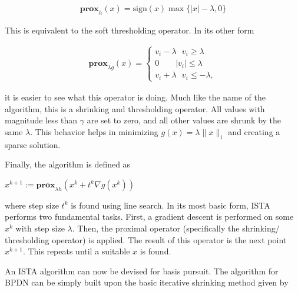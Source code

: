 \documentclass[10pt]{article} %
\begin{document}

\begin{align*}
    \mathbf{prox}_{h}(x)=\mathrm{sign}(x)\max\{|x|-\lambda, 0\}
\end{align*}

\noindent This is equivalent to the soft thresholding operator. In its other form

\vspace{\baselineskip}
\begin{align*}
    \mathbf{prox}_{\lambda g}(x) = 
    \begin{cases}
    v_i - \lambda \ \ \ v_i \geq \lambda\\
    0 \ \ \ \ \ \ \ \ \ |v_i| \leq \lambda \\
    v_i + \lambda \ \ \  v_i \leq - \lambda,
    \end{cases}
\end{align*}


\vspace{\baselineskip}

\noindent it is easier to see what this operator is doing. Much like the name of the algorithm, this is a shrinking and thresholding operator. All values with magnitude less than $\gamma$ are set to zero, and all other values are shrunk by the same $\lambda$. This behavior helps in minimizing $g(x) = \lambda \|x\|_1$ and creating a sparse solution.

\vspace{\baselineskip}

\noindent Finally, the algorithm is defined as 

\begin{center}
    $x^{k+1} := \mathbf{prox}_{\lambda h} (x^k + t^k \nabla g(x^k))$
\end{center}

\noindent where step size $t^k$ is found using line search. In its most basic form, ISTA performs two fundamental tasks. First, a gradient descent is performed on some $x^k$ with step size $\lambda$. Then, the proximal operator (specifically the shrinking/ thresholding operator) is applied. The result of this operator is the next point $x^{k+1}$. This repeats until a suitable $x$ is found. 

An ISTA algorithm can now be devised for basis pursuit. The algorithm for BPDN can be simply built upon the basic iterative shrinking method given by
\end{document}

